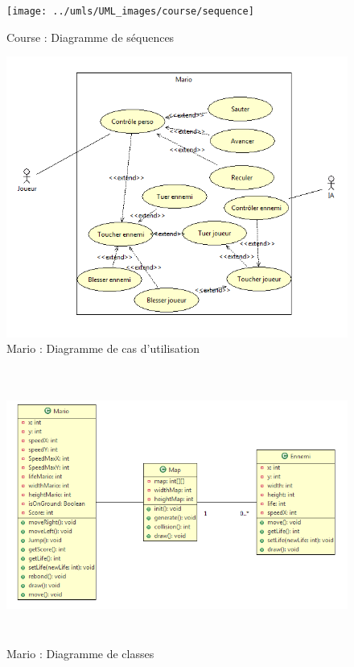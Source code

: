 \begin{figure}[h]
 \centering
 \texttt{[image: ../umls/UML\_images/course/sequence]} \hfill
 \caption{Course : Diagramme de séquences}
\end{figure}

\clearpage

\begin{figure}[h]
 \centering
 \includegraphics[width=\textwidth]{../umls/UML_images/Mario/Utilisation} \hfill
 \caption{Mario : Diagramme de cas d'utilisation}
\end{figure}

\begin{figure}[h]
 \centering
 \includegraphics[height=9cm]{../umls/UML_images/Mario/Class} \hfill
 \caption{Mario : Diagramme de classes}
\end{figure}

